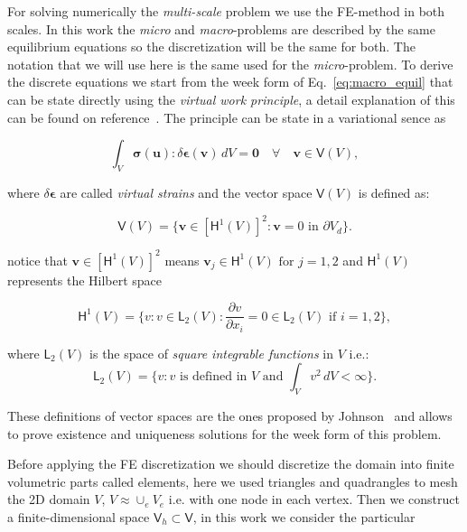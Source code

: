 \documentclass[review]{elsarticle}
\begin{document}
For solving numerically the \emph{multi-scale} problem we use the
FE-method in both scales.
In this work the \emph{micro} and \emph{macro}-problems 
are described by the same equilibrium equations so the discretization will
be the same for both. The notation that we will use here is the same used for
the \emph{micro}-problem.
To derive the discrete equations we start from the week form
of Eq.~\ref{eq:macro_equil} that can be state directly using the \emph{virtual work
principle}, a detail explanation of this can be found on reference~\cite{bathe-virt-work}.
The principle can be state in a variational sence as

\begin{equation}
\int_V \bm{\sigma}(\bm{u}) : \delta \bm{\epsilon}(\bm{v})
\, dV = \bm{0} \quad \forall \quad \bm{v} \in \bm{\mathsf{V}}(V),
\end{equation}

\noindent
where $\delta \bm{\epsilon}$ are called \emph{virtual strains} and the vector
space $\bm{\mathsf{V}}(V)$ is defined as:

\begin{equation}
\bm{\mathsf{V}}(V) =
\{ 
  \bm{v} \in \left[\bm{\mathsf{H}}^1(V)\right]^2: \bm{v}=0 \text{ in } \partial V_d
\}.
\end{equation}

\noindent
notice that $\bm{v} \in \left[\bm{\mathsf{H}}^1(V)\right]^2$ means 
$\bm{v}_j \in \bm{\mathsf{H}}^1(V) \text{ for } j=1,2$ and $\bm{\mathsf{H}}^1(V) $ 
represents the Hilbert space

\begin{equation}
\bm{\mathsf{H}}^1(V) = \{ 
  v : v \in \bm{\mathsf{L}}_2(V): \frac{\partial v}{\partial x_i}=0 \in \bm{\mathsf{L}}_2(V)
  \text{ if } i=1,2 
\},
\end{equation}

\noindent
where $\bm{\mathsf{L}}_2(V)$ is the space of \emph{square integrable functions} in $V$
i.e.:
\begin{equation}
\bm{\mathsf{L}}_2(V) = \{ 
  v : v \text{ is defined in } V \text{ and } \int_V v^2 \, dV < \infty
\}.
\end{equation}

These definitions of vector spaces are the ones proposed by
Johnson~\cite{johnson-first} and allows to prove existence and uniqueness
solutions for the week form of this problem.

Before applying the FE discretization we should discretize the domain into finite
volumetric parts called elements, here we used triangles and quadrangles to mesh
the 2D domain $V$, $V \approx \cup_e V_e$ i.e. with one node in each vertex.
Then we construct a finite-dimensional space 
$\bm{\mathsf{V}}_h \subset \bm{\mathsf{V}}$, in this work we consider the
particular
\end{document}
